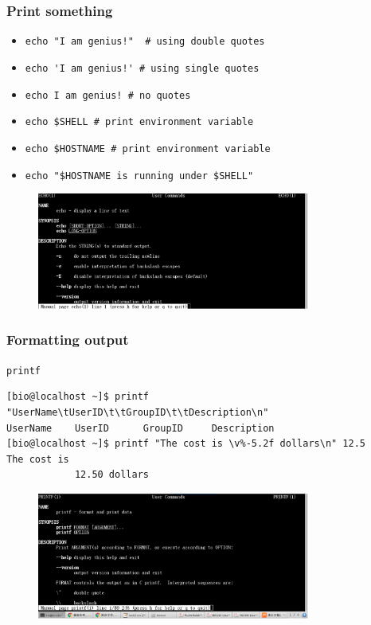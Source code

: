 \documentclass[red]{beamer}
\begin{document}
\begin{CJK*}{UTF8}{gbsn}
\begin{frame}[containsverbatim]
\frametitle{Print something}
\begin{itemize}
	\item \lstinline{echo "I am genius!"  # using double quotes}
	\item \lstinline{echo 'I am genius!' # using single quotes}
	\item \lstinline{echo I am genius! # no quotes}
	\item \lstinline{echo $SHELL # print environment variable}
	\item \lstinline{echo $HOSTNAME # print environment variable}
	\item \lstinline{echo "$HOSTNAME is running under $SHELL"}
\end{itemize}
\begin{figure}[ht]
\includegraphics[width=0.80\textwidth]{images/echo.png}
\end{figure}
\end{frame}

\begin{frame}
\frametitle{Formatting output}
\lstinline{printf}
\begin{lstlisting}[basicstyle=\ttfamily\tiny]
[bio@localhost ~]$ printf "UserName\tUserID\t\tGroupID\t\tDescription\n"
UserName	UserID		GroupID		Description
[bio@localhost ~]$ printf "The cost is \v%-5.2f dollars\n" 12.5 
The cost is 
            12.50 dollars
\end{lstlisting}
\begin{figure}[ht]
\includegraphics[width=0.80\textwidth]{images/printf.png}
\end{figure}
\end{frame}


\end{CJK*}
\end{document}
